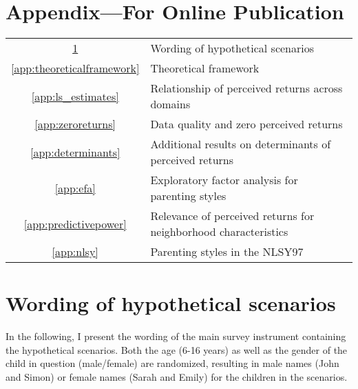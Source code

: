 \documentclass[12pt, a4paper, english]{article}
\begin{document}
\clearpage
{}
\printbibliography
{}
\onehalfspacing

\clearpage
\appendix
\onehalfspacing
\vspace{.5cm}

\section*{\centering Appendix---For Online Publication}

\begin{table}[h!]\centering
\begin{tabular}{cl}
\toprule
\ref{app:scenario_text} & Wording of hypothetical scenarios \\
\ref{app:theoreticalframework} & Theoretical framework \\
\ref{app:ls_estimates} & Relationship of perceived returns across domains \\
\ref{app:zeroreturns} & Data quality and zero perceived returns \\
\ref{app:determinants} & Additional results on determinants of perceived returns \\
\ref{app:efa} & Exploratory factor analysis for parenting styles \\
\ref{app:predictivepower} & Relevance of perceived returns for neighborhood characteristics \\
\ref{app:nlsy} & Parenting styles in the NLSY97 \\
\bottomrule
\end{tabular}
\end{table}
\clearpage
\setcounter{table}{0}
\setcounter{figure}{0}
\setcounter{footnote}{0}

\renewcommand{\thesection}{\Alph{section}}
\renewcommand{\thetable}{\Alph{section}.\arabic{table}}
\renewcommand{\thefigure}{\Alph{section}.\arabic{figure}}

\section{Wording of hypothetical scenarios}\label{app:scenario_text}
In the following, I present the wording of the main survey instrument containing the hypothetical scenarios. Both the age (6-16 years) as well as the gender of the child in question (male/female) are randomized, resulting in male names (John and Simon) or female names (Sarah and Emily) for the children in the scenarios. \\
\end{document}
